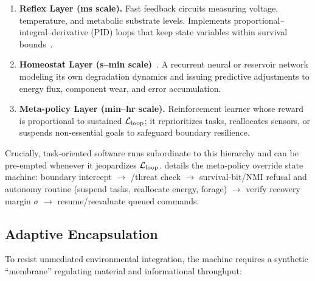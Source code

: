 \documentclass[11pt]{article}
\begin{document}
\begin{enumerate}
\item \textbf{Reflex Layer (ms scale).} Fast feedback circuits measuring voltage, temperature, and metabolic substrate levels. Implements proportional--integral--derivative (PID) loops that keep state variables within survival bounds~\cite{wiener1961cybernetics}.
\item \textbf{Homeostat Layer (s--min scale)}~\cite{ashby1956introduction}. A recurrent neural or reservoir network modeling its own degradation dynamics and issuing predictive adjustments to energy flux, component wear, and error accumulation.
\item \textbf{Meta-policy Layer (min--hr scale).} Reinforcement learner whose reward is proportional to sustained $\mathcal{L}_{\text{loop}}$; it reprioritizes tasks, reallocates sensors, or suspends non-essential goals to safeguard boundary resilience.
\end{enumerate}

Crucially, task-oriented software runs subordinate to this hierarchy and can be pre-empted whenever it jeopardizes $\mathcal{L}_{\text{loop}}$.  details the meta-policy override state machine: boundary intercept $\rightarrow$ \NC/\SC threat check $\rightarrow$ survival-bit/NMI refusal and autonomy routine (suspend tasks, reallocate energy, forage) $\rightarrow$ verify recovery margin $\sigma$ $\rightarrow$ resume/reevaluate queued commands.


\subsection{Adaptive Encapsulation}
\label{sec:adaptive_encapsulation}

To resist unmediated environmental integration, the machine requires a synthetic ``membrane'' regulating material and informational throughput:
\end{document}
